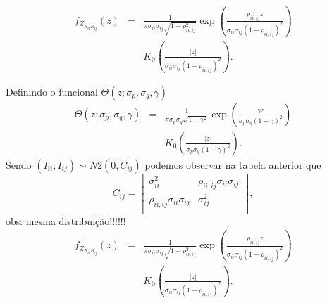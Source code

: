 \documentclass[conference]{IEEEtran}
\begin{document}
\begin{equation}
\begin{array}{ccc}
	f_{Z_{R_{ii}R_{ij}}}(z)&=&\frac{1}{\pi\sigma_{ii}\sigma_{ij}\sqrt{1-\rho_{ii,ij}^2}}\exp\left(\frac{\rho_{ii,ij}z}{\sigma_{ii}\sigma_{ij}(1-\rho_{ii,ij})^2}\right)\\
	&&K_0\left(\frac{|z|}{\sigma_{ii}\sigma_{ij}(1-\rho_{ii,ij})^2}\right).
\end{array}
\end{equation}

Definindo o funcional $\Theta(z;\sigma_p,\sigma_q,\gamma)$
\begin{equation}
\begin{array}{ccc}
	\Theta(z;\sigma_p,\sigma_q,\gamma)&=&\frac{1}{\pi\sigma_p\sigma_q\sqrt{1-\gamma^2}}\exp\left(\frac{\gamma z}{\sigma_p\sigma_q(1-\gamma)^2}\right)\\
	&&K_0\left(\frac{|z|}{\sigma_p\sigma_q(1-\gamma)^2}\right).
\end{array}
\end{equation}
Sendo $(I_{ii}, I_{ij})\sim N2(0, C_{ij})$ podemos observar na tabela anterior que 
\begin{equation}
C_{ij}=\left[
\begin{array}{cc}
	\sigma_{ii}^2   &  \rho_{ii,ij}\sigma_{ii}\sigma_{ij}  \\
	\rho_{ii,ij}\sigma_{ii}\sigma_{ij} & \sigma_{ij}^2   \\
\end{array}
\right],
\end{equation}
obs: mesma distribuição!!!!!!
\begin{equation}
\begin{array}{ccc}
	f_{Z_{R_{ii}R_{ij}}}(z)&=&\frac{1}{\pi\sigma_{ii}\sigma_{ij}\sqrt{1-\rho_{ii,ij}^2}}\exp\left(\frac{\rho_{ii,ij}z}{\sigma_{ii}\sigma_{ij}(1-\rho_{ii,ij})^2}\right)\\
	&&K_0\left(\frac{|z|}{\sigma_{ii}\sigma_{ij}(1-\rho_{ii,ij})^2}\right).
\end{array}
\end{equation}
\end{document}
